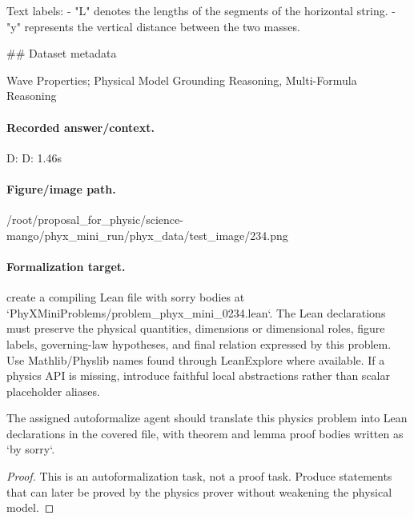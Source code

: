 Text labels:
- "L" denotes the lengths of the segments of the horizontal string.
- "y" represents the vertical distance between the two masses.

\#\# Dataset metadata

Wave Properties; Physical Model Grounding Reasoning, Multi-Formula Reasoning

\paragraph{Recorded answer/context.}
D: D: 1.46s

\paragraph{Figure/image path.}
/root/proposal\_for\_physic/science-mango/phyx\_mini\_run/phyx\_data/test\_image/234.png

\paragraph{Formalization target.}
create a compiling Lean file with sorry bodies at `PhyXMiniProblems/problem\_phyx\_mini\_0234.lean`. The Lean declarations must preserve the physical quantities, dimensions or dimensional roles, figure labels, governing-law hypotheses, and final relation expressed by this problem.
Use Mathlib/Physlib names found through LeanExplore where available. If a physics API is missing, introduce faithful local abstractions rather than scalar placeholder aliases.

\begin{theorem}
\label{thm:physics:phyx_mini_0234:target}
The assigned autoformalize agent should translate this physics problem into Lean declarations in the covered file, with theorem and lemma proof bodies written as `by sorry`.
\end{theorem}
\begin{proof}
This is an autoformalization task, not a proof task. Produce statements that can later be proved by the physics prover without weakening the physical model.
\end{proof}

